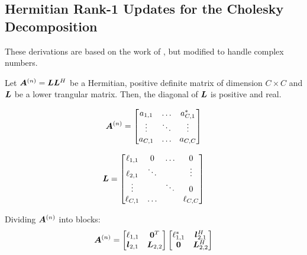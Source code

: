 \begin{appendices}



\chapter{Hermitian Rank-1 Updates for the Cholesky Decomposition} \label{chapter:Cholesky}
These derivations are based on the work of \cite{krause2015more}, but modified to handle complex numbers.


Let $\bm{A}^{(n)} = \bm{L}\bm{L}^H$ be a Hermitian, positive definite matrix of dimension $C \times C$ and $\bm{L}$ be a lower trangular matrix. Then, the diagonal of $\bm{L}$ is positive and real.

\begin{equation}
\bm{A}^{(n)} = \begin{bmatrix} a_{1,1} & \hdots & a_{C,1}^{*} \\
                      \vdots & \ddots & \vdots \\
                      a_{C,1} & \hdots & a_{C,C}
      \end{bmatrix}
\end{equation}

\begin{equation}
\bm{L} = \begin{bmatrix} \ell_{1,1} & 0      & \hdots & 0 \\
                      \ell_{2,1} & \ddots &        & \vdots \\
                      \vdots     &        &  \ddots &  0     \\
                      \ell_{C,1}     & \hdots &   & \ell_{C,C}
      \end{bmatrix}
\end{equation}

Dividing $\bm{A}^{(n)}$ into blocks:
\begin{equation}
\bm{A}^{(n)} = \begin{bmatrix}\ell_{1,1} & \bm{0}^T \\ \bm{l}_{2,1} & \bm{L}_{2,2} \end{bmatrix} \begin{bmatrix} \ell_{1,1}^{*} & \bm{l}_{2,1}^H \\ \bm{0} & \bm{L}_{2,2}^H \end{bmatrix} 
\end{equation}


\end{appendices}
